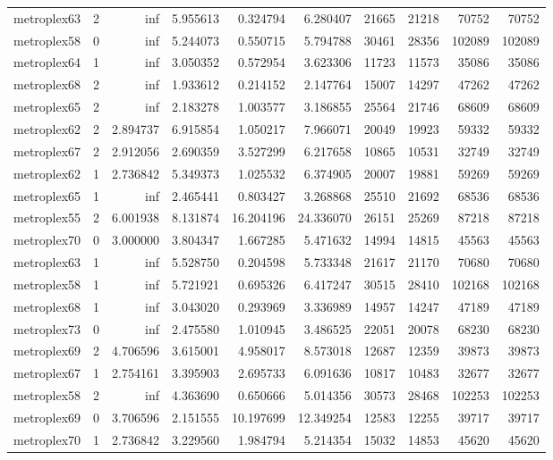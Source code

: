 \begin{longtable}{|l|r|r|r|r|r|r|r|r|r|}
metroplex63 & 2 & inf & 5.955613 & 0.324794 & 6.280407 & 21665 & 21218 & 70752 & 70752 \\
metroplex58 & 0 & inf & 5.244073 & 0.550715 & 5.794788 & 30461 & 28356 & 102089 & 102089 \\
metroplex64 & 1 & inf & 3.050352 & 0.572954 & 3.623306 & 11723 & 11573 & 35086 & 35086 \\
metroplex68 & 2 & inf & 1.933612 & 0.214152 & 2.147764 & 15007 & 14297 & 47262 & 47262 \\
metroplex65 & 2 & inf & 2.183278 & 1.003577 & 3.186855 & 25564 & 21746 & 68609 & 68609 \\
metroplex62 & 2 & 2.894737 & 6.915854 & 1.050217 & 7.966071 & 20049 & 19923 & 59332 & 59332 \\
metroplex67 & 2 & 2.912056 & 2.690359 & 3.527299 & 6.217658 & 10865 & 10531 & 32749 & 32749 \\
metroplex62 & 1 & 2.736842 & 5.349373 & 1.025532 & 6.374905 & 20007 & 19881 & 59269 & 59269 \\
metroplex65 & 1 & inf & 2.465441 & 0.803427 & 3.268868 & 25510 & 21692 & 68536 & 68536 \\
metroplex55 & 2 & 6.001938 & 8.131874 & 16.204196 & 24.336070 & 26151 & 25269 & 87218 & 87218 \\
metroplex70 & 0 & 3.000000 & 3.804347 & 1.667285 & 5.471632 & 14994 & 14815 & 45563 & 45563 \\
metroplex63 & 1 & inf & 5.528750 & 0.204598 & 5.733348 & 21617 & 21170 & 70680 & 70680 \\
metroplex58 & 1 & inf & 5.721921 & 0.695326 & 6.417247 & 30515 & 28410 & 102168 & 102168 \\
metroplex68 & 1 & inf & 3.043020 & 0.293969 & 3.336989 & 14957 & 14247 & 47189 & 47189 \\
metroplex73 & 0 & inf & 2.475580 & 1.010945 & 3.486525 & 22051 & 20078 & 68230 & 68230 \\
metroplex69 & 2 & 4.706596 & 3.615001 & 4.958017 & 8.573018 & 12687 & 12359 & 39873 & 39873 \\
metroplex67 & 1 & 2.754161 & 3.395903 & 2.695733 & 6.091636 & 10817 & 10483 & 32677 & 32677 \\
metroplex58 & 2 & inf & 4.363690 & 0.650666 & 5.014356 & 30573 & 28468 & 102253 & 102253 \\
metroplex69 & 0 & 3.706596 & 2.151555 & 10.197699 & 12.349254 & 12583 & 12255 & 39717 & 39717 \\
metroplex70 & 1 & 2.736842 & 3.229560 & 1.984794 & 5.214354 & 15032 & 14853 & 45620 & 45620 \\

\end{longtable}
